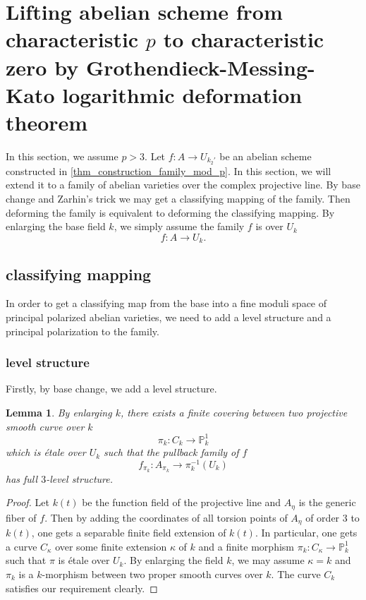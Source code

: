 \documentclass[12pt,twoside]{book}
\theoremstyle{plain}
\newtheorem{lemma}[lemma]{Lemma}
\theoremstyle{definition}
\theoremstyle{remark}
\newcommand{\bP}{{\mathbb P}}
\numberwithin{equation}{section}
\begin{document}
\section{\bf Lifting abelian scheme from characteristic $p$ to characteristic zero by Grothendieck-Messing-Kato logarithmic deformation theorem} \label{sec_main_lifting}

In this section, we assume $p>3$. Let $f\colon A\rightarrow U_{k_2'}$ be an abelian scheme constructed in \autoref{thm_construction_family_mod_p}. In this section, we will extend it to a family of abelian varieties over the complex projective line. By base change and Zarhin's trick we may get a classifying mapping of the family. Then deforming the family is equivalent to deforming the classifying mapping. By enlarging the base field $k$, we simply assume the family $f$ is over $U_{k}$
\[f\colon A\rightarrow U_k.\]

\subsection{classifying mapping} \label{sec_sub_classifying_mapping}
In order to get a classifying map from the base into a fine moduli space of principal polarized abelian varieties, we need to add a level structure and a principal polarization to the family.

\subsubsection{level structure} \label{sec_subsub_level}

Firstly, by base change, we add a level structure.
\begin{lemma} \label{thm_add_level}
By enlarging $k$, there exists a finite covering between two projective smooth curve over $k$
\[\pi_k\colon C_k \rightarrow \bP_k^1\]
which is \'etale over $U_k$ such that the pullback family of $f$
\[f_{\pi_k}\colon A_{\pi_k} \rightarrow \pi_k^{-1}(U_k)\]
has full $3$-level structure.
\end{lemma}
\begin{proof}
Let $k(t)$ be the function field of the projective line and $A_\eta$ is the generic fiber of $f$. Then by adding the coordinates of all torsion points of $A_\eta$ of order $3$ to $k(t)$, one gets a separable finite field extension of $k(t)$. In particular, one gets a curve $C_{\kappa}$ over some finite extension $\kappa$ of $k$ and a finite morphism $\pi_k\colon C_\kappa\rightarrow \mathbb P^1_k$ such that $\pi$ is \'etale over $U_k$. By enlarging the field $k$, we may assume $\kappa=k$ and $\pi_k$ is a $k$-morphism between two proper smooth curves over $k$. The curve $C_k$ satisfies our requirement clearly.
\end{proof}
\end{document}
